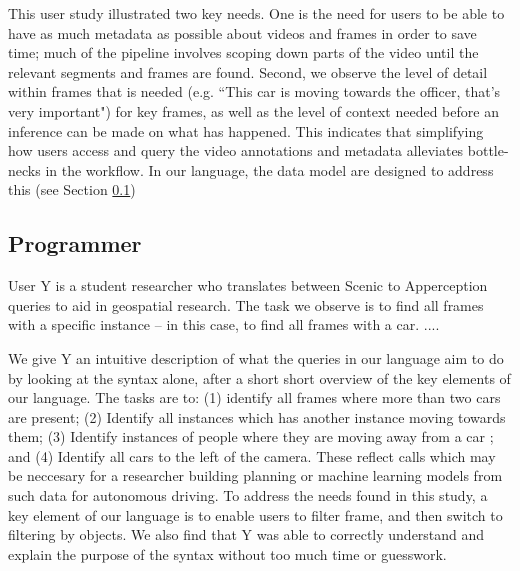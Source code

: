 This user study illustrated two key needs. One is the need for users to be able to have as much metadata as possible about videos and frames in order to save time; much of the pipeline involves scoping down parts of the video until the relevant segments and frames are found. Second, we observe the level of detail within frames that is needed (e.g. ``This car is moving towards the officer, that's very important") for key frames, as well as the level of context needed before an inference can be made on what has happened. This indicates that simplifying how users access and query the video annotations and metadata alleviates bottle-necks in the workflow. In our language, the data model are designed to address this (see Section \ref{})




\subsection{Programmer}

User Y is a student researcher who translates between Scenic to Apperception queries to aid in geospatial research. The task we observe is to find all frames with a specific instance -- in this case, to find all frames with a car.
....

We give Y an intuitive description of what the queries in our language aim to do by looking at the syntax alone, after a short short overview of the key elements of our language. The tasks are to: (1) identify all frames where more than two cars are present; (2) Identify all instances which has another instance moving towards them; (3) Identify instances of people where they are moving away from a car ; and (4) Identify all cars to the left of the camera. These reflect calls which may be neccesary for a researcher building planning or machine learning models from such data for autonomous driving. To address the needs found in this study, a key element of our language is to enable users to filter frame, and then switch to filtering by objects. We also find that Y was able to correctly understand and explain the purpose of the syntax without too much time or guesswork.



